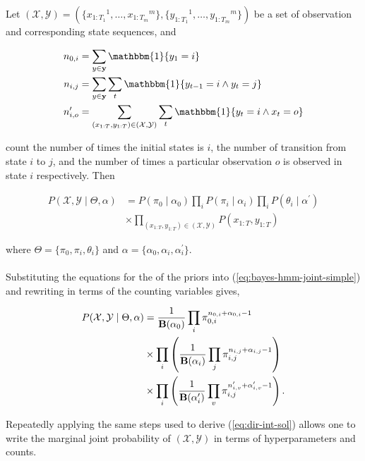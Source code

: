 \documentclass[12pt]{report}
\newcommand{\p}[0]{\prime}
\newcommand{\1}[0]{\mathbbm{1}}
\newcommand{\Bf}[0]{\text{\textbf{B}}}
\newcommand{\seq}[3]{\ensuremath{#1_{{#2}:{#3}}}}
\begin{document}
Let $(\mathcal{X}, \mathcal{Y}) = (\{\seq{x}{1}{T_1}^1, \ldots, \seq{x}{1}{T_m}^m\},
\{\seq{y}{1}{T_1}^1, \ldots, \seq{y}{1}{T_m}^m\})$ be a set of
observation and corresponding state sequences, and

\begin{align*}
    n_{0, i} &= \sum_{y \in \mathbf{y}} \1\{y_1 = i\} \\
    n_{i, j} &= \sum_{y \in \mathbf{y}} \sum_{t} \1\{y_{t-1} = i \wedge y_t = j\} \\
    n_{i, o}^\p &= \sum_{(\seq{x}{1}{T},\seq{y}{1}{T}) \in (\mathcal{X},\mathcal{Y})} \sum_{t} \1\{y_t = i \wedge x_t = o\} \\
\end{align*}

count the number of times the initial states is $i$, the number of transition from state $i$ to $j$,
and the number of times a particular observation $o$ is observed in state $i$ respectively. Then

\begin{align}  \label{eq:bayes-hmm-joint-simple}
 P(\mathcal{X}, \mathcal{Y} \mid \Theta, \alpha)
 &=  P(\pi_0 \mid \alpha_0) \prod_i P(\pi_i \mid \alpha_i) \prod_i P(\theta_i \mid \alpha^\prime) \nonumber\\
 & \times \prod_{(\seq{x}{1}{T},\seq{y}{1}{T}) \in (\mathcal{X},\mathcal{Y})} P(\seq{x}{1}{T},\seq{y}{1}{T})
\end{align}

where $\Theta = \{\pi_0, \pi_i, \theta_i\}$ and $\alpha = \{\alpha_0, \alpha_i, \alpha_i^\prime\}$.
\\\\
Substituting the equations for the of the priors into (\ref{eq:bayes-hmm-joint-simple})
and rewriting in terms of the counting variables gives,

\begin{align} \label{eq:bayes-hmm-joint-full}
    P(\mathcal{X}, \mathcal{Y} \mid \Theta, \alpha)
    &= \frac{1}{\Bf(\alpha_0)} \prod_{i} \pi_{0,i}^{n_{0,i} + \alpha_{0,i} - 1} \nonumber \\
    & \times \prod_i \left(\frac{1}{\Bf(\alpha_i)} \prod_{j} \pi_{i,j}^{n_{i,j} + \alpha_{i,j} - 1}\right) \nonumber \\
    & \times \prod_i \left(\frac{1}{\Bf(\alpha_i^\prime)} \prod_{v} \pi_{i,j}^{n_{i,v}^\prime + \alpha_{i,v}^\prime - 1}\right).
\end{align}

Repeatedly applying the same steps used to derive (\ref{eq:dir-int-sol})
allows one to write the marginal joint probability of $(\mathcal{X}, \mathcal{Y})$
in terms of hyperparameters and counts.
\end{document}

